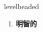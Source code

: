 
\begin{frame}
{\huge levelheaded}
\begin{center}
\begin{enumerate}\Large
  \item \textbf{明智的}
\end{enumerate}
\end{center}
\end{frame}
